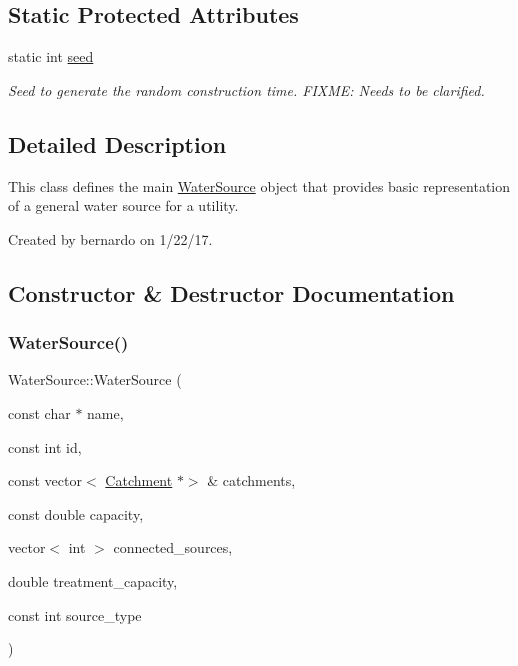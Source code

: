 \subsection*{Static Protected Attributes}
\begin{DoxyCompactItemize}
\item 
static int \mbox{\hyperlink{classWaterSource_abaf6cb0ecca08c87428ad516f11f8c2e}{seed}}
\begin{DoxyCompactList}\small\item\em Seed to generate the random construction time. F\+I\+X\+ME\+: Needs to be clarified. \end{DoxyCompactList}\end{DoxyCompactItemize}


\subsection{Detailed Description}
This class defines the main {\ttfamily \mbox{\hyperlink{classWaterSource}{Water\+Source}}} object that provides basic representation of a general water source for a utility. 

Created by bernardo on 1/22/17. 

\subsection{Constructor \& Destructor Documentation}
\mbox{\label{classWaterSource_a27b9d29d6cbb36d128f740f7ca00f500}} 
\subsubsection{\texorpdfstring{Water\+Source()}{WaterSource()}\hspace{0.1cm}{\footnotesize\ttfamily [1/8]}}
{\footnotesize\ttfamily Water\+Source\+::\+Water\+Source (\begin{DoxyParamCaption}\item[{const char $\ast$}]{name,  }\item[{const int}]{id,  }\item[{const vector$<$ \mbox{\hyperlink{classCatchment}{Catchment}} $\ast$$>$ \&}]{catchments,  }\item[{const double}]{capacity,  }\item[{vector$<$ int $>$}]{connected\+\_\+sources,  }\item[{double}]{treatment\+\_\+capacity,  }\item[{const int}]{source\+\_\+type }\end{DoxyParamCaption})}



